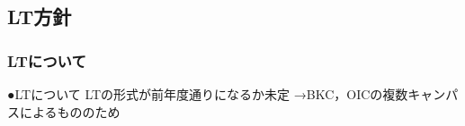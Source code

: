 \subsection*{LT方針}


\subsubsection*{LTについて}
●LTについて
 LTの形式が前年度通りになるか未定
  →BKC，OICの複数キャンパスによるもののため

